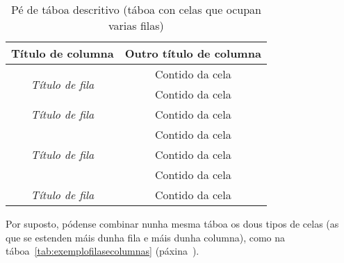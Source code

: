 \begin{table}[hp!]
  \centering
  \begin{tabular}{c|c}
  \rowcolor{udcpink!25}
  \textbf{Título de columna} & \textbf{Outro título de columna} \\\hline
  \multirow{2}{*}{\textit{Título de fila}} & \cellcolor{udcgray!25} Contido da cela \\
                                           & Contido da cela \\
  \rowcolor{udcgray!25}
  \textit{Título de fila}                  & Contido da cela \\
  \multirow{3}{*}{\textit{Título de fila}} & Contido da cela \\
                                           & \cellcolor{udcgray!25} Contido da cela \\
                                           & Contido da cela \\
  \rowcolor{udcgray!25}
  \textit{Título de fila}                  & Contido da cela \\
  \end{tabular}
  \caption{Pé de táboa descritivo (táboa con celas que ocupan varias filas)}
  \label{tab:exemplofilas}
\end{table}

Por suposto, pódense combinar nunha mesma táboa os dous tipos de celas (as que se 
estenden máis dunha fila e máis dunha columna), como na táboa~\ref{tab:exemplofilasecolumnas}
(páxina~\pageref{tab:exemplofilasecolumnas}).

